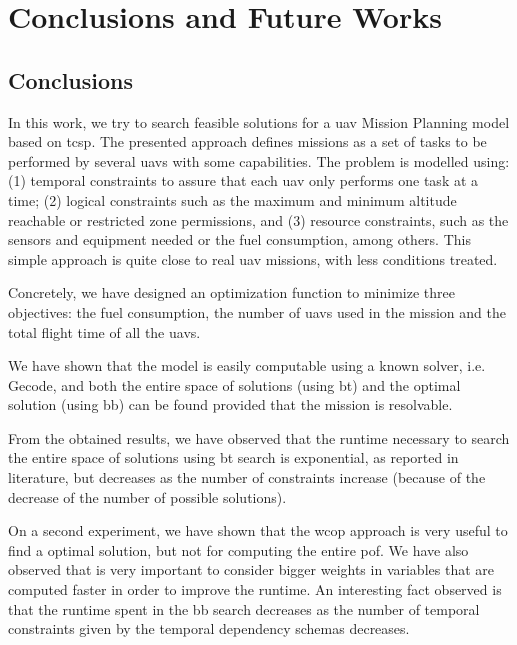 
\chapter{Conclusions and Future Works} %
\label{Chapter6}

\section{Conclusions}
In this work, we try to search feasible solutions for a \gls{uav} Mission Planning model based on \gls{tcsp}. The presented approach defines missions as a set of tasks to be performed by several \glspl{uav} with some capabilities. The problem is modelled using: (1) temporal constraints to assure that each \gls{uav} only performs one task at a time; (2) logical constraints such as the maximum and minimum altitude reachable or restricted zone permissions, and (3) resource constraints, such as the sensors and equipment needed or the fuel consumption, among others. This simple approach is quite close to real \gls{uav} missions, with less conditions treated.

Concretely, we have designed an optimization function to minimize three objectives: the fuel consumption, the number of \glspl{uav} used in the mission and the total flight time of all the \glspl{uav}.

We have shown that the model is easily computable using a known solver, i.e. Gecode, and both the entire space of solutions (using \gls{bt}) and the optimal solution (using \gls{bb}) can be found provided that the mission is resolvable.

From the obtained results, we have observed that the runtime necessary to search the entire space of solutions using \gls{bt} search is exponential, as reported in literature, but decreases as the number of constraints increase (because of the decrease of the number of possible solutions).

On a second experiment, we have shown that the \gls{wcop} approach is very useful to find a optimal solution, but not for computing the entire \gls{pof}. We have also observed that is very important to consider bigger weights in variables that are computed faster in order to improve the runtime. An interesting fact observed is that the runtime spent in the \gls{bb} search decreases as the number of temporal constraints given by the temporal dependency schemas decreases.


